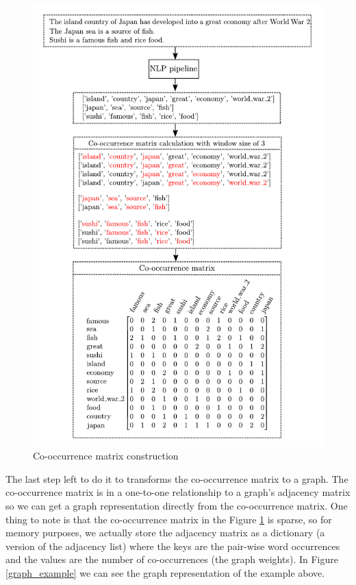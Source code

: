 \documentclass[12pt]{article}
\numberwithin{equation}{section}
\begin{document}
\begin{spacing}{1.5}
	
	\begin{figure}[H]
		\vspace{-0.5cm}
		\centering
		\includegraphics[scale=0.85]{context_diagram}		
		\caption{Co-occurrence matrix construction}
		\label{co_matrix_construction}
	\end{figure}
	
	The last step left to do it to transforms the co-occurrence matrix to a graph. The co-occurrence matrix is in a one-to-one relationship to a graph's adjacency matrix so we can get a graph representation directly from the co-occurrence matrix. One thing to note is that the co-occurrence matrix in the Figure \ref{co_matrix_construction} is sparse, so for memory purposes, we actually store the adjacency matrix as a dictionary (a version of the adjacency list) where the keys are the pair-wise word occurrences and the values are the number of co-occurrences (the graph weights).
	In Figure \ref{graph_example} we can see the graph representation of the example above.
	

\end{spacing}
\end{document}
